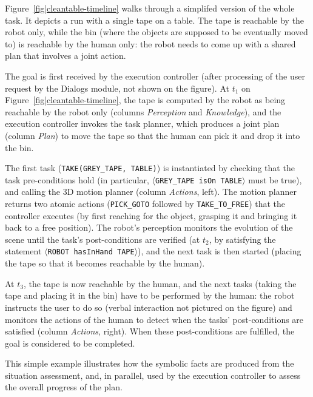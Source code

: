 \documentclass[preprint,3p,times]{elsarticle}
\newcommand{\concept}[1]{{\small \texttt{#1}}}
\newcommand{\stmt}[1]{{\footnotesize\tt$\langle$#1\relax$\rangle$}}
\begin{document}
Figure~\ref{fig|cleantable-timeline} walks through a simplifed version of the whole
task. It depicts a run with a single tape on a table. The tape is
reachable by the robot only, while the bin (where the objects are supposed to be
eventually moved to) is reachable by the human only: the robot needs to come up
with a shared plan that involves a joint action.

The goal is first received by the execution controller (after processing of the
user request by the {\sc Dialogs} module, not shown on the figure). At $t_1$ on
Figure~\ref{fig|cleantable-timeline}, the tape is computed by the robot as being
reachable by the robot only (columns \emph{Perception} and \emph{Knowledge}),
and the execution controller invokes the task planner, which produces a joint
plan (column \emph{Plan}) to move the tape so that the human can pick it and
drop it into the bin.

The first task (\concept{TAKE(GREY\_TAPE, TABLE)}) is instantiated by checking
that the task pre-conditions hold (in particular, \stmt{GREY\_TAPE isOn TABLE}
must be true), and calling the 3D motion planner (column \emph{Actions},
left). The motion planner returns two atomic actions ({\tt PICK\_GOTO} followed
by {\tt TAKE\_TO\_FREE}) that the controller executes (by first reaching for
the object, grasping it and bringing it back to a free position).  The robot's
perception monitors the evolution of the scene until the task's post-conditions
are verified (at $t_2$, by satisfying the statement \stmt{ROBOT hasInHand
TAPE}), and the next task is then started (placing the tape so that it becomes
reachable by the human).

At $t_3$, the tape is now reachable by the human, and the next tasks (taking the
tape and placing it in the bin) have to be performed by the human: the robot
instructs the user to do so (verbal interaction not pictured on the figure) and
monitors the actions of the human to detect when the tasks' post-conditions are
satisfied (column \emph{Actions}, right). When these post-conditions are
fulfilled, the goal is considered to be completed.

This simple example illustrates how the symbolic facts are produced from the
situation assessment, and, in parallel, used by the execution controller to
assess the overall progress of the plan.
\end{document}
